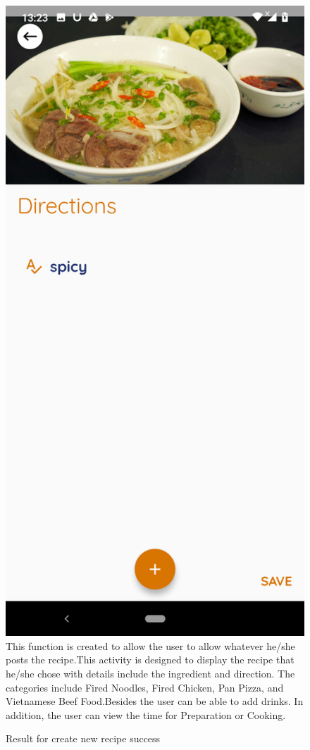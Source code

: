 \documentclass{article}
\begin{document}
\begin{figure}[h!]
        \includegraphics[scale=0.1]{Images/pho_dire.jpg}
        This function is created to allow the user to allow whatever he/she posts the recipe.This activity is designed to display the recipe that he/she chose with details include the ingredient and direction. The categories include Fired Noodles, Fired Chicken, Pan Pizza, and Vietnamese Beef Food.Besides the user can be able to add drinks. In addition, the user can view the time for Preparation or Cooking. 
        \caption{Result for create new recipe success}
        \label{fig:cookingbook}
        \end{figure}
\end{document}
